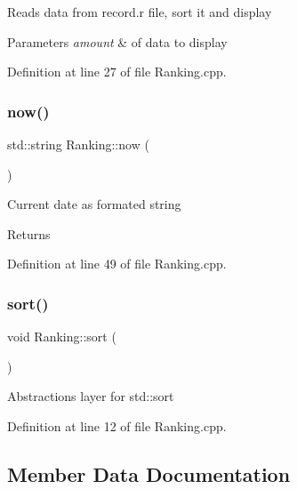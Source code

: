 Reads data from record.\+r file, sort it and display 
\begin{DoxyParams}{Parameters}
{\em amount} & of data to display \\
\hline
\end{DoxyParams}


Definition at line 27 of file Ranking.\+cpp.

\mbox{\label{classRanking_aa3ed270c7a8a059568c3af87fd73bd03}} 
\subsubsection{\texorpdfstring{now()}{now()}}
{\footnotesize\ttfamily std\+::string Ranking\+::now (\begin{DoxyParamCaption}{ }\end{DoxyParamCaption})\hspace{0.3cm}{\ttfamily [private]}}

Current date as formated string \begin{DoxyReturn}{Returns}

\end{DoxyReturn}


Definition at line 49 of file Ranking.\+cpp.

\mbox{\label{classRanking_aa77c088257f2ac17f165147283136016}} 
\subsubsection{\texorpdfstring{sort()}{sort()}}
{\footnotesize\ttfamily void Ranking\+::sort (\begin{DoxyParamCaption}{ }\end{DoxyParamCaption})\hspace{0.3cm}{\ttfamily [private]}}

Abstractions layer for std\+::sort 

Definition at line 12 of file Ranking.\+cpp.



\subsection{Member Data Documentation}
\mbox{\label{classRanking_aead444bd691bbfa450ccdec64012ab86}} 
